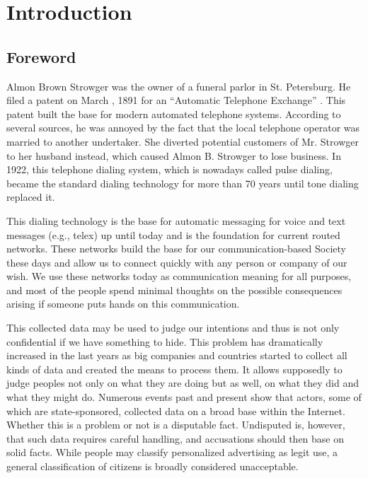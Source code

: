 
\part{Introduction}
\chapter{Foreword}
Almon Brown Strowger was the owner of a funeral parlor in St. Petersburg. He filed a patent on March , 1891 for an ``Automatic Telephone Exchange'' \cite{pulseDialingPatent}. This patent built the base for modern automated telephone systems. According to several sources, he was annoyed by the fact that the local telephone operator was married to another undertaker. She diverted potential customers of Mr. Strowger to her husband instead, which caused Almon B. Strowger to lose business. In 1922, this telephone dialing system, which is nowadays called pulse dialing, became the standard dialing technology for more than 70 years until tone dialing replaced it.

This dialing technology is the base for automatic messaging for voice and text messages (e.g., telex) up until today and is the foundation for current routed networks. These networks build the base for our communication-based Society these days and allow us to connect quickly with any person or company of our wish. We use these networks today as communication meaning for all purposes, and most of the people spend minimal thoughts on the possible consequences arising if someone puts hands on this communication. 

This collected data may be used to judge our intentions and thus is not only confidential if we have something to hide. This problem has dramatically increased in the last years as big companies and countries started to collect all kinds of data and created the means to process them. It allows supposedly to judge peoples not only on what they are doing but as well, on what they did and what they might do. Numerous events past and present show that actors, some of which are state-sponsored, collected data on a broad base within the Internet. Whether this is a problem or not is a disputable fact. Undisputed is, however, that such data requires careful handling, and accusations should then base on solid facts. While people may classify personalized advertising as legit use, a general classification of citizens is broadly considered unacceptable\cite{NCR2013,XKeyscore,Ball2013,Greenberg2013,Leuenberger1989}.

